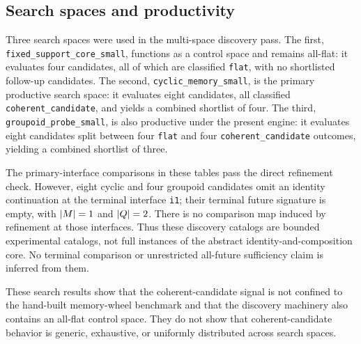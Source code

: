 \documentclass[11pt]{article}
\theoremstyle{definition}
\begin{document}
\subsection{Search spaces and productivity}\label{subsec:discovery-spaces}
Three search spaces were used in the multi-space discovery pass. The first, \nolinkurl{fixed_support_core_small}, functions as a control space and remains all-flat: it evaluates four candidates, all of which are classified \texttt{flat}, with no shortlisted follow-up candidates. The second, \texttt{cyclic\_memory\_small}, is the primary productive search space: it evaluates eight candidates, all classified \texttt{coherent\_candidate}, and yields a combined shortlist of four. The third, \texttt{groupoid\_probe\_small}, is also productive under the present engine: it evaluates eight candidates split between four \texttt{flat} and four \texttt{coherent\_candidate} outcomes, yielding a combined shortlist of three.

The primary-interface comparisons in these tables pass the direct refinement check. However, eight cyclic and four groupoid candidates omit an identity continuation at the terminal interface \texttt{i1}; their terminal future signature is empty, with $|M|=1$ and $|Q|=2$. There is no comparison map induced by refinement at those interfaces. Thus these discovery catalogs are bounded experimental catalogs, not full instances of the abstract identity-and-composition core. No terminal comparison or unrestricted all-future sufficiency claim is inferred from them.

These search results show that the coherent-candidate signal is not confined to the hand-built memory-wheel benchmark and that the discovery machinery also contains an all-flat control space. They do not show that coherent-candidate behavior is generic, exhaustive, or uniformly distributed across search spaces.

\begin{table}[H]
\centering
\caption{Multi-space discovery summary from the tracked discovery note.}
\label{tab:discovery-multispace}
\footnotesize
\setlength{\tabcolsep}{4pt}
\end{table}
\end{document}
